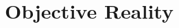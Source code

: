\documentclass[
11pt,
titlepage,
reqno,
]{article}%
\theoremstyle{definition}
\begin{document}
\pagebreak



\section{Objective Reality}\label{sec:world}
\end{document}
